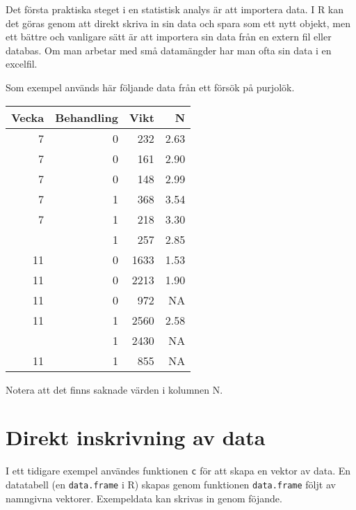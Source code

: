 \documentclass[
]{book}
\theoremstyle{definition}
\theoremstyle{definition}
\theoremstyle{definition}
\theoremstyle{definition}
\theoremstyle{remark}
\begin{document}
Det första praktiska steget i en statistisk analys är att importera data. I R kan det göras genom att direkt skriva in sin data och spara som ett nytt objekt, men ett bättre och vanligare sätt är att importera sin data från en extern fil eller databas. Om man arbetar med små datamängder har man ofta sin data i en excelfil.

Som exempel används här följande data från ett försök på purjolök.

\begin{table}
\centering
\begin{tabular}[t]{rrrr}
\toprule
Vecka & Behandling & Vikt & N\\
\midrule
7 & 0 & 232 & 2.63\\
7 & 0 & 161 & 2.90\\
7 & 0 & 148 & 2.99\\
7 & 1 & 368 & 3.54\\
7 & 1 & 218 & 3.30\\
\addlinespace
7 & 1 & 257 & 2.85\\
11 & 0 & 1633 & 1.53\\
11 & 0 & 2213 & 1.90\\
11 & 0 & 972 & NA\\
11 & 1 & 2560 & 2.58\\
\addlinespace
11 & 1 & 2430 & NA\\
11 & 1 & 855 & NA\\
\bottomrule
\end{tabular}
\end{table}

Notera att det finns saknade värden i kolumnen N.

\hypertarget{direkt-inskrivning-av-data}{%
\section{Direkt inskrivning av data}\label{direkt-inskrivning-av-data}}

I ett tidigare exempel användes funktionen \texttt{c} för att skapa en vektor av data. En datatabell (en \texttt{data.frame} i R) skapas genom funktionen \texttt{data.frame} följt av namngivna vektorer. Exempeldata kan skrivas in genom föjande.
\end{document}
